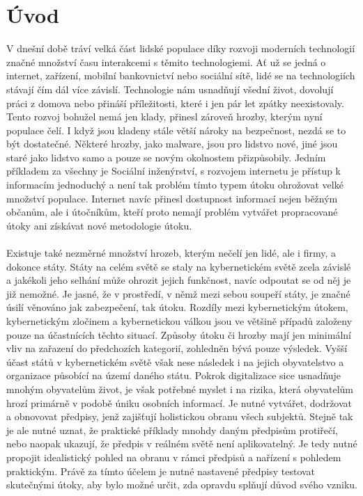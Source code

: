 
\section{Úvod}\label{sec:uvod}
V dnešní době tráví velká část lidské populace díky rozvoji moderních technologií značné množství času interakcemi s těmito technologiemi.
Ať už se jedná o internet,  zařízení, mobilní bankovnictví nebo sociální sítě, lidé se na technologiích stávají čím dál více závislí.
Technologie nám usnadňují všední život, dovolují práci z domova nebo přináší příležitosti, které i jen pár let zpátky neexistovaly.
Tento rozvoj bohužel nemá jen klady, přinesl zároveň hrozby, kterým nyní populace čelí.
I když jsou kladeny stále větší nároky na bezpečnost, nezdá se to být dostatečné.
Některé hrozby, jako malware, jsou pro lidstvo nové, jiné jsou staré jako lidstvo samo a pouze se novým okolnostem přizpůsobily.
Jedním příkladem za všechny je Sociální inženýrství, s rozvojem internetu je přístup k informacím jednoduchý a není tak problém tímto typem útoku ohrožovat velké množství populace.
Internet navíc přinesl dostupnost informací nejen běžným občanům, ale i útočníkům, kteří proto nemají problém vytvářet propracované útoky ani získávat nové metodologie útoku.

\paragraph{}
Existuje také nezměrné množství hrozeb, kterým nečelí jen lidé, ale i firmy, a dokonce státy.
Státy na celém světě se staly na kybernetickém světě zcela závislé a jakékoli jeho selhání může ohrozit jejich funkčnost, navíc odpoutat se od něj je již nemožné\cite{LI20218176}.
Je jasné, že v prostředí, v němž mezi sebou soupeří státy, je značné úsilí věnováno jak zabezpečení, tak útoku.
Rozdíly mezi kybernetickým útokem, kybernetickým zločinem a kybernetickou válkou jsou ve většině případů založeny pouze na účastnících těchto situací\cite{LI20218176, Enisa_thread_landscape}.
Způsoby útoku či hrozby mají jen minimální vliv na zařazení do předchozích kategorií, zohledněn bývá pouze výsledek.
Vyšší účast států v kybernetickém světě však nese následek i na jejich obyvatelstvo a organizace působící na území daného státu.
Pokrok digitalizace sice usnadňuje mnohým obyvatelům život, je však potřebné myslet i na rizika, která obyvatelům hrozí primárně v podobě úniku osobních informací.
Je nutné vytvářet, dodržovat a obnovovat předpisy, jenž zajišťují holistickou obranu všech subjektů.
Stejně tak je ale nutné uznat, že praktické příklady mnohdy daným předpisům protiřečí, nebo naopak ukazují, že předpis v reálném světě není aplikovatelný.
Je tedy nutné propojit idealistický pohled na obranu v rámci předpisů a nařízení s pohledem praktickým.
Právě za tímto účelem je nutné nastavené předpisy testovat skutečnými útoky, aby bylo možné určit, zda opravdu splňují důvod svého vzniku.

